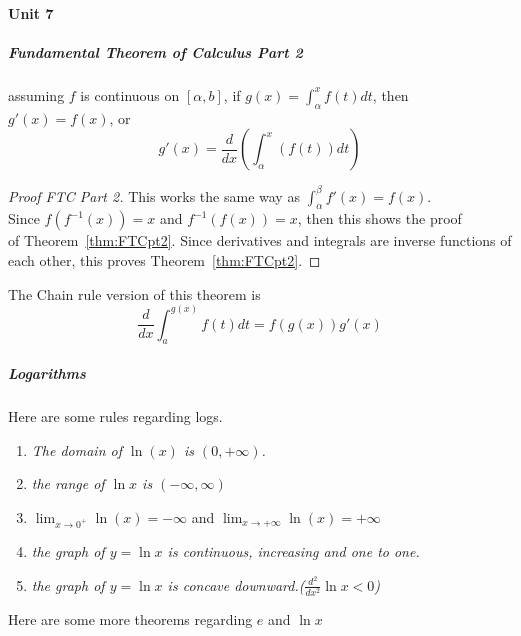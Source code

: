 \documentclass{article} %
\begin{document}
            \paragraph{Unit 7}
                \subparagraph{Fundamental Theorem of Calculus Part 2}
                    \begin{theorem}
                        \label{thm:FTCpt2}
                        assuming $f$ is continuous on $[\alpha,b]$, if $g(x)=\int_{\alpha}^{x}f(t)dt$, then $g'(x)=f(x)$, or \begin{equation} g'(x) = \frac{d}{dx}(\int_{\alpha}^{x}(f(t))dt) \end{equation}
                    \end{theorem}
                    \begin{proof}[Proof FTC Part 2]
                        This works the same way as $\int_{\alpha}^{\beta}f'(x)=f(x)$. \\Since $f(f^{-1}(x))=x$ and $f^{-1}(f(x))=x$, then this shows the proof \\of Theorem~\ref{thm:FTCpt2}.
                        Since derivatives and integrals are inverse functions of each other, this proves Theorem~\ref{thm:FTCpt2}.
                    \end{proof}
                    The Chain rule version of this theorem is \begin{equation}
                        \frac{d}{dx}\int_{a}^{g(x)}f(t)dt = f(g(x))g'(x)
                    \end{equation}
                \subparagraph{Logarithms}
                    Here are some rules regarding logs.
                    \begin{enumerate}
                        \item \textit{The domain of \emph{$\ln(x)$} is \emph{$(0,+\infty)$}.}
                        \item \textit{the range of \emph{$\ln x$} is $(-\infty,\infty)$}
                        \item $\lim_{x\rightarrow0^+}\ln(x)=-\infty$ and $\lim_{x\rightarrow+\infty}\ln(x)=+\infty$
                        \item \textit{the graph of \emph{$y=\ln x$} is continuous, increasing and one to one.}
                        \item \textit{the graph of \emph{$y=\ln x$} is concave downward.(\emph{$\frac{d^2}{dx^2}\ln x < 0$})}
                    \end{enumerate}
                    Here are some more theorems regarding $e$ and $\ln x$
\end{document}
